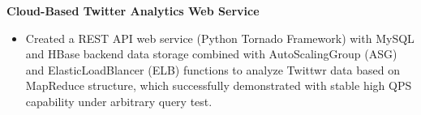 {\raggedright\normalsize \textbf{Cloud-Based Twitter Analytics Web Service}} %

\begin{itemize}[leftmargin=*, topsep=1pt, partopsep=1.5pt]
\setlength\itemsep{1pt}
\item Created a REST API web service (Python Tornado Framework) with MySQL and HBase backend data storage combined with AutoScalingGroup (ASG) and ElasticLoadBlancer (ELB) functions to analyze Twittwr data based on MapReduce structure, which successfully demonstrated with stable high QPS capability under arbitrary query test.
\end{itemize}

